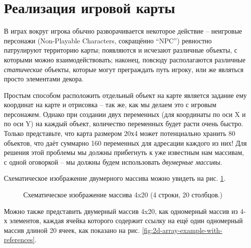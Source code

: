\documentclass[../sparc.tex]{subfiles}
\begin{document}
\section{Реализация игровой карты}

В играх вокруг игрока обычно разворачивается некоторое действие -- неигровые
персонажи (Non-Playable Characters, сокращённо ``NPC'') ревностно патрулируют
территорию карты; появляются и исчезают различные объекты, с которыми можно
взаимодействовать; наконец, повсюду располагаются различные \emph{статические}
объекты, которые могут преграждать путь игроку, или же являться просто
элементами декора.

Простым способом расположить отдельный объект на карте является задание ему
координат на карте и отрисовка -- так же, как мы делаем это с игровым
персонажем.  Однако при создании двух переменных (для координаты по оси X и по
оси Y) на каждый объект, количество переменных будет расти очень быстро.  Только
представьте, что карта размером 20х4 может потенциально хранить 80 объектов, что
даёт суммарно 160 переменных для адресации каждого из них!  Для решения этой
проблемы мы должны прибегнуть к уже известным нам массивам, с одной оговоркой --
мы должны будем использовать \emph{двумерные массивы}.

Схематическое изображение двумерного массива можно увидеть на
рис. \ref{fig:2d-array-example}.

\begin{figure}[ht]
  \centering
  \caption{Схематическое изображение массива 4x20 (4 строки, 20 столбцов.)}
  \label{fig:2d-array-example}
\end{figure}

Можно также представить двумерный массив 4x20, как одномерный массив из 4-х
элементов, каждая ячейка которого содержит ссылку на ещё один одномерный массив
длиной 20 ячеек, как показано на
рис. \ref{fig:2d-array-example-with-references}.
\end{document}
